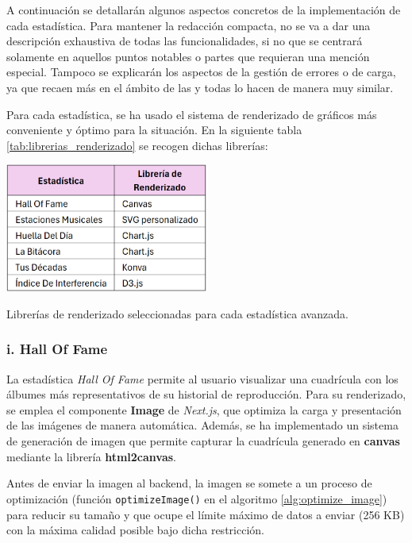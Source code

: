 A continuación se detallarán algunos aspectos concretos de la implementación de cada estadística. Para mantener la redacción compacta, no se va a dar una descripción exhaustiva de todas las funcionalidades, si no que se centrará solamente en aquellos puntos notables o partes que requieran una mención especial. Tampoco se explicarán los aspectos de la gestión de errores o de carga, ya que recaen más en el ámbito de las  y todas lo hacen de manera muy similar.

Para cada estadística, se ha usado el sistema de renderizado de gráficos más conveniente y óptimo para la situación. En la siguiente tabla \ref{tab:librerias_renderizado} se recogen dichas librerías:

\begin{table}[htbp]
    \centering
    \includegraphics[width=0.5\textwidth]{figures/implementacion/librerias_renderizado.png}
    \captionsetup{skip=5pt}
    \caption{Librerías de renderizado seleccionadas para cada estadística avanzada.}
    \label{tab:librerias_renderizado}
\end{table}

\subsubsection*{i. Hall Of Fame}

La estadística \textit{Hall Of Fame} permite al usuario visualizar una cuadrícula con los álbumes más representativos de su historial de reproducción. Para su renderizado, se emplea el componente \textbf{Image} de \textit{Next.js}, que optimiza la carga y presentación de las imágenes de manera automática. Además, se ha implementado un sistema de generación de imagen que permite capturar la cuadrícula generado en \textbf{canvas} mediante la librería \textbf{html2canvas}.

\newpage

Antes de enviar la imagen al backend, la imagen se somete a un proceso de optimización (función \texttt{optimizeImage()} en el algoritmo \ref{alg:optimize_image}) para reducir su tamaño y que ocupe el límite máximo de datos a enviar (256 KB) con la máxima calidad posible bajo dicha restricción.

